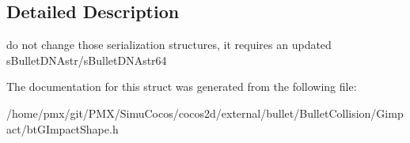 \subsection{Detailed Description}
do not change those serialization structures, it requires an updated s\+Bullet\+D\+N\+Astr/s\+Bullet\+D\+N\+Astr64 

The documentation for this struct was generated from the following file\+:\begin{DoxyCompactItemize}
\item 
/home/pmx/git/\+P\+M\+X/\+Simu\+Cocos/cocos2d/external/bullet/\+Bullet\+Collision/\+Gimpact/bt\+G\+Impact\+Shape.\+h\end{DoxyCompactItemize}
